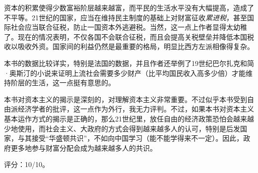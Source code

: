 资本的积累使得少数富裕阶层越来越富，而平民的生活水平没有大幅提高，造成了不平等。21世纪的国家，应当在维持民主制度的基础上对财富征收\emph{累进税}，甚至国际社会应当联合征税，防止一国资本外逃避税。当然，这一点上作者显得太幼稚了。现在的情况表明，不仅各国不会联合征税，而且会提高关税壁垒并降低本国税收以吸收外资。国家间的利益仍然是最重要的格局，明显比西方左派相像得复杂。

本书的数据比较详实，特别是法国的数据，并且作者还举例了19世纪巴尔扎克和简·奥斯汀的小说来证明上流社会需要多少财产（比平均国民收入高多少倍）才能维持阶层的生活，这一点挺有意思的。

本书对资本主义的揭示是深刻的，对理解资本主义非常重要。不过似乎本书受到自由派经济学者的批评，这一点作为外行，我无力评判。不过，如果本书对资本主义基本运作方式的揭示是正确的，那么21世纪里，放任自由的经济政策恐怕会越来越少地使用，而社会主义、大政府的方式会得到越来越多人的认可，特别是后发国家，与其接受“华盛顿共识”，不如向中国学习（能不能学得来不一定）。因此，政府更多地参与财富分配会成为越来越多人的共识。

评分：10/10。
